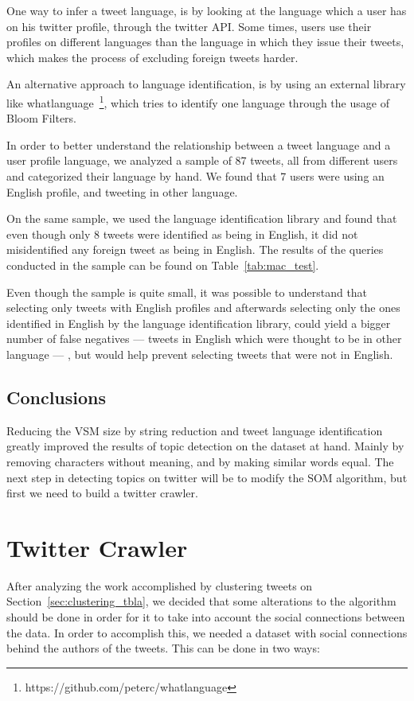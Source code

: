 One way to infer a tweet language, is by looking at the language which a user has on his twitter profile, through the twitter API. Some times, users use their profiles on different languages than the language in which they issue their tweets, which makes the process of excluding foreign tweets harder.

An alternative approach to language identification, is by using an external library like whatlanguage~\footnote{https://github.com/peterc/whatlanguage}, which tries to identify one language through the usage of Bloom Filters.  

In order to better understand the relationship between a tweet language and a user profile language, we analyzed a sample of 87 tweets, all from different users and categorized their language by hand. We found that 7 users were using an English profile, and tweeting in other language.

On the same sample, we used the language identification library and found that even though only 8 tweets were identified as being in English, it did not misidentified any foreign tweet as being in English. The results of the queries conducted in the sample can be found on Table~\ref{tab:mac_test}.  



Even though the sample is quite small, it was possible to understand that selecting only tweets with English profiles and afterwards selecting only the ones identified in English by the language identification library, could yield a bigger number of false negatives --- tweets in English which were thought to be in other language ---  , but would help prevent selecting tweets that were not in English.

\subsection{Conclusions}
\label{sub:conclusions}
Reducing the \ac{VSM} size by string reduction and tweet language identification greatly improved the results of topic detection on the dataset at hand. Mainly by removing characters without meaning, and by making similar words equal. The next step in detecting topics on twitter will be to modify the \ac{SOM} algorithm, but first we need to build a twitter crawler. 

\section{Twitter Crawler}
\label{sec:twitter_crawler}
After analyzing the work accomplished by clustering tweets on Section~\ref{sec:clustering_tbla}, we decided that some alterations to the algorithm should be done in order for it to take into account the social connections between the data. In order to accomplish this, we needed a dataset with social connections behind the authors of the tweets. This can be done in two ways:

